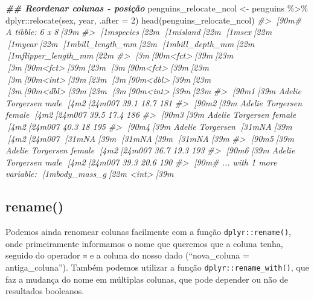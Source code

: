 \documentclass[
]{book}
\newenvironment{Shaded}{\begin{snugshade}}{\end{snugshade}}
\newcommand{\AttributeTok}[1]{\textcolor[rgb]{0.61,0.61,0.61}{#1}}
\newcommand{\CommentTok}[1]{\textcolor[rgb]{0.37,0.37,0.37}{\textit{#1}}}
\newcommand{\DecValTok}[1]{\textcolor[rgb]{0.06,0.06,0.06}{#1}}
\newcommand{\DocumentationTok}[1]{\textcolor[rgb]{0.37,0.37,0.37}{\textbf{\textit{#1}}}}
\newcommand{\FunctionTok}[1]{\textcolor[rgb]{0,0,0}{#1}}
\newcommand{\NormalTok}[1]{#1}
\newcommand{\OtherTok}[1]{\textcolor[rgb]{0.37,0.37,0.37}{#1}}
\newcommand{\SpecialCharTok}[1]{\textcolor[rgb]{0,0,0}{#1}}
\begin{document}
\begin{Shaded}
\begin{Highlighting}[]
\DocumentationTok{\#\# Reordenar colunas {-} posição}
\NormalTok{penguins\_relocate\_ncol }\OtherTok{\textless{}{-}}\NormalTok{ penguins }\SpecialCharTok{\%\textgreater{}\%} 
\NormalTok{  dplyr}\SpecialCharTok{::}\FunctionTok{relocate}\NormalTok{(sex, year, }\AttributeTok{.after =} \DecValTok{2}\NormalTok{)}
\FunctionTok{head}\NormalTok{(penguins\_relocate\_ncol)}
\CommentTok{\#\textgreater{} [90m\# A tibble: 6 x 8[39m}
\CommentTok{\#\textgreater{}   [1mspecies[22m [1misland[22m    [1msex[22m     [1myear[22m [1mbill\_length\_mm[22m [1mbill\_depth\_mm[22m [1mflipper\_length\_mm[22m}
\CommentTok{\#\textgreater{}   [3m[90m\textless{}fct\textgreater{}[39m[23m   [3m[90m\textless{}fct\textgreater{}[39m[23m     [3m[90m\textless{}fct\textgreater{}[39m[23m  [3m[90m\textless{}int\textgreater{}[39m[23m          [3m[90m\textless{}dbl\textgreater{}[39m[23m         [3m[90m\textless{}dbl\textgreater{}[39m[23m             [3m[90m\textless{}int\textgreater{}[39m[23m}
\CommentTok{\#\textgreater{} [90m1[39m Adelie  Torgersen male    [4m2[24m007           39.1          18.7               181}
\CommentTok{\#\textgreater{} [90m2[39m Adelie  Torgersen female  [4m2[24m007           39.5          17.4               186}
\CommentTok{\#\textgreater{} [90m3[39m Adelie  Torgersen female  [4m2[24m007           40.3          18                 195}
\CommentTok{\#\textgreater{} [90m4[39m Adelie  Torgersen [31mNA[39m      [4m2[24m007           [31mNA[39m            [31mNA[39m                  [31mNA[39m}
\CommentTok{\#\textgreater{} [90m5[39m Adelie  Torgersen female  [4m2[24m007           36.7          19.3               193}
\CommentTok{\#\textgreater{} [90m6[39m Adelie  Torgersen male    [4m2[24m007           39.3          20.6               190}
\CommentTok{\#\textgreater{} [90m\# ... with 1 more variable: [1mbody\_mass\_g[22m \textless{}int\textgreater{}[39m}
\end{Highlighting}
\end{Shaded}

\hypertarget{rename}{%
\subsection{rename()}\label{rename}}

Podemos ainda renomear colunas facilmente com a função \texttt{dplyr::rename()}, onde primeiramente informamos o nome que queremos que a coluna tenha, seguido do operador \texttt{=} e a coluna do nosso dado (``nova\_coluna = antiga\_coluna''). Também podemos utilizar a função \texttt{dplyr::rename\_with()}, que faz a mudança do nome em múltiplas colunas, que pode depender ou não de resultados booleanos.
\end{document}
